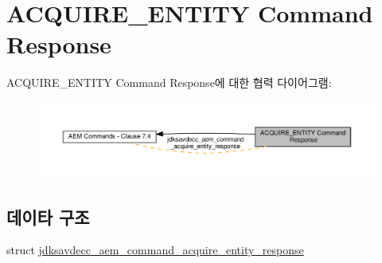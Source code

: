 \hypertarget{group__command__acquire__entity__response}{}\section{A\+C\+Q\+U\+I\+R\+E\+\_\+\+E\+N\+T\+I\+TY Command Response}
\label{group__command__acquire__entity__response}
A\+C\+Q\+U\+I\+R\+E\+\_\+\+E\+N\+T\+I\+TY Command Response에 대한 협력 다이어그램\+:
\nopagebreak
\begin{figure}[H]
\begin{center}
\leavevmode
\includegraphics[width=350pt]{group__command__acquire__entity__response}
\end{center}
\end{figure}
\subsection*{데이타 구조}
\begin{DoxyCompactItemize}
\item 
struct \hyperlink{structjdksavdecc__aem__command__acquire__entity__response}{jdksavdecc\+\_\+aem\+\_\+command\+\_\+acquire\+\_\+entity\+\_\+response}
\end{DoxyCompactItemize}
